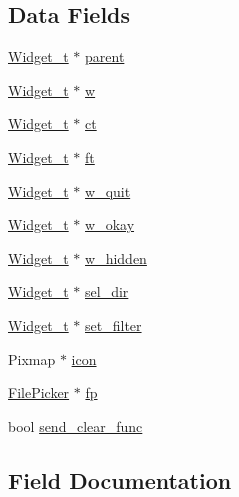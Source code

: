 \subsection*{Data Fields}
\begin{DoxyCompactItemize}
\item 
\hyperlink{structWidget__t}{Widget\+\_\+t} $\ast$ \hyperlink{structFileDialog_a0191278ea61e2542e47b62bffcbea4a8}{parent}
\item 
\hyperlink{structWidget__t}{Widget\+\_\+t} $\ast$ \hyperlink{structFileDialog_a235a24e7b496907e837d01a314db40e5}{w}
\item 
\hyperlink{structWidget__t}{Widget\+\_\+t} $\ast$ \hyperlink{structFileDialog_a1a89f3fe9568efce4a79349bcc561141}{ct}
\item 
\hyperlink{structWidget__t}{Widget\+\_\+t} $\ast$ \hyperlink{structFileDialog_ad15e967663f79ed2fa43c0e01460631c}{ft}
\item 
\hyperlink{structWidget__t}{Widget\+\_\+t} $\ast$ \hyperlink{structFileDialog_ae855ef41be4645e18ae4585059547502}{w\+\_\+quit}
\item 
\hyperlink{structWidget__t}{Widget\+\_\+t} $\ast$ \hyperlink{structFileDialog_abcf7e51f397752ebe38216295c73ae60}{w\+\_\+okay}
\item 
\hyperlink{structWidget__t}{Widget\+\_\+t} $\ast$ \hyperlink{structFileDialog_a0fe749b6ae4ca193b9adbcda174bd72a}{w\+\_\+hidden}
\item 
\hyperlink{structWidget__t}{Widget\+\_\+t} $\ast$ \hyperlink{structFileDialog_a27aa368bdf57cc763d26b329fcbac79b}{sel\+\_\+dir}
\item 
\hyperlink{structWidget__t}{Widget\+\_\+t} $\ast$ \hyperlink{structFileDialog_a58a21885d0351511b7c3a1aace0472dd}{set\+\_\+filter}
\item 
Pixmap $\ast$ \hyperlink{structFileDialog_a1cd92000f92c13e9c35cbdfffe2a0eca}{icon}
\item 
\hyperlink{structFilePicker}{File\+Picker} $\ast$ \hyperlink{structFileDialog_a22cc735bfba009cf73e12b4843f84c30}{fp}
\item 
bool \hyperlink{structFileDialog_a7406a6392b89039bdebfeaf57981e289}{send\+\_\+clear\+\_\+func}
\end{DoxyCompactItemize}


\subsection{Field Documentation}
\mbox{\label{structFileDialog_a1a89f3fe9568efce4a79349bcc561141}} 
